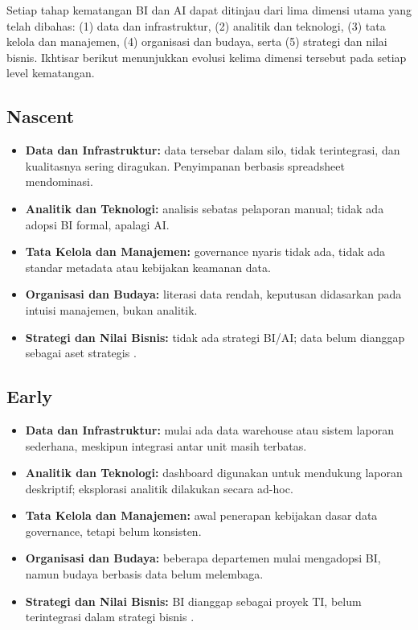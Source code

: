Setiap tahap kematangan BI dan AI dapat ditinjau dari lima dimensi utama yang telah dibahas: 
(1) data dan infrastruktur, (2) analitik dan teknologi, (3) tata kelola dan manajemen, 
(4) organisasi dan budaya, serta (5) strategi dan nilai bisnis. 
Ikhtisar berikut menunjukkan evolusi kelima dimensi tersebut pada setiap level kematangan.

\subsection{Nascent}
\begin{itemize}
	\item \textbf{Data dan Infrastruktur:} data tersebar dalam silo, tidak terintegrasi, dan kualitasnya sering diragukan. Penyimpanan berbasis spreadsheet mendominasi.
	\item \textbf{Analitik dan Teknologi:} analisis sebatas pelaporan manual; tidak ada adopsi BI formal, apalagi AI.
	\item \textbf{Tata Kelola dan Manajemen:} governance nyaris tidak ada, tidak ada standar metadata atau kebijakan keamanan data.
	\item \textbf{Organisasi dan Budaya:} literasi data rendah, keputusan didasarkan pada intuisi manajemen, bukan analitik.
	\item \textbf{Strategi dan Nilai Bisnis:} tidak ada strategi BI/AI; data belum dianggap sebagai aset strategis \cite{russom2011, tdwi2013}.
\end{itemize}

\subsection{Early}
\begin{itemize}
	\item \textbf{Data dan Infrastruktur:} mulai ada data warehouse atau sistem laporan sederhana, meskipun integrasi antar unit masih terbatas.
	\item \textbf{Analitik dan Teknologi:} dashboard digunakan untuk mendukung laporan deskriptif; eksplorasi analitik dilakukan secara ad-hoc.
	\item \textbf{Tata Kelola dan Manajemen:} awal penerapan kebijakan dasar data governance, tetapi belum konsisten.
	\item \textbf{Organisasi dan Budaya:} beberapa departemen mulai mengadopsi BI, namun budaya berbasis data belum melembaga.
	\item \textbf{Strategi dan Nilai Bisnis:} BI dianggap sebagai proyek TI, belum terintegrasi dalam strategi bisnis \cite{schieder2011decision, raj2018}.
\end{itemize}


